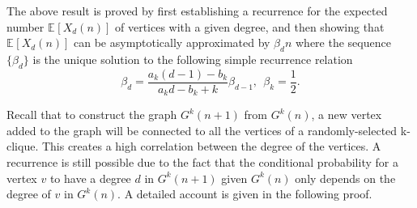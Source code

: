 \documentclass[11pt]{article}
\providecommand{\expectation}[2]{\mathbb{E}_{#2}\left[#1\right]}
\providecommand{\rktree}[2]{G^{#1}(#2)}
\providecommand{\tdeg}[2]{X_{#1}(#2)}
\providecommand{\edeg}[2]{\expectation{\tdeg{#1}{#2}}{}}
\begin{document}
The above result is proved by first establishing a recurrence  
for the expected number $\edeg{d}{n}$ of vertices with a given degree, and then showing that 
$\edeg{d}{n}$ can be asymptotically approximated by $\beta_d n$ where
the sequence $\{\beta_d\}$ is the unique solution to the following simple recurrence relation 
\begin{equation}
\label{eq-limit-case}
 \beta_d = \frac{a_k(d - 1) - b_k}{a_kd - b_k + k} \beta_{d - 1},\ \  \beta_{k} = \frac{1}{2}.
\end{equation}

Recall that to construct the graph $\rktree{k}{n + 1}$ from $\rktree{k}{n}$,
a new vertex added to the graph  will be connected to all the vertices of
a randomly-selected k-clique. This creates a high correlation between the degree of the vertices.
A recurrence is still possible due to the fact that
the conditional probability for a vertex $v$ to have
a degree $d$ in $\rktree{k}{n + 1}$ given $\rktree{k}{n}$ only depends on
the degree of $v$ in $\rktree{k}{n}$. A detailed account is given in the following proof.
\end{document}

